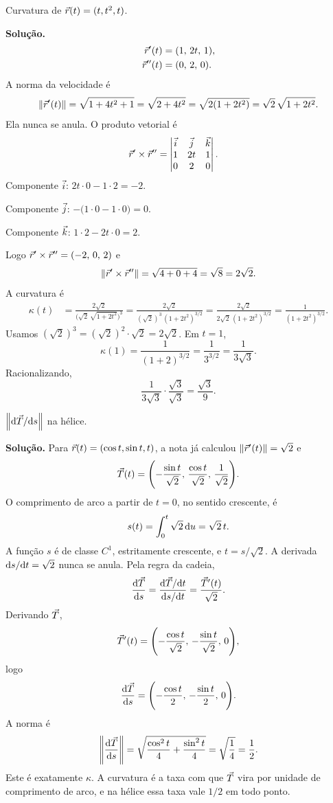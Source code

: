 \documentclass[11pt,a4paper]{article}
\begin{document}
\begin{exercicio}[Intermediário --- I2]
Curvatura de \(\vec{r}(t)=(t,t^{2},t)\).
\end{exercicio}

\noindent\textbf{Solução.}
\begin{align*}
\vec{r}'(t)&=(1,\,2t,\,1),\\
\vec{r}''(t)&=(0,\,2,\,0).
\end{align*}
A norma da velocidade é
\[
\left\lVert \vec{r}'(t) \right\rVert
=\sqrt{1+4t^{2}+1}
=\sqrt{2+4t^{2}}
=\sqrt{2(1+2t^{2})}
=\sqrt{2}\,\sqrt{1+2t^{2}}.
\]
Ela nunca se anula. O produto vetorial é
\begin{align*}
\vec{r}'\times\vec{r}''
&=
\begin{vmatrix}
\vec{i}&\vec{j}&\vec{k}\\
1&2t&1\\
0&2&0
\end{vmatrix}.
\end{align*}
Componente \(\vec{i}\): \(2t\cdot 0-1\cdot 2=-2\).

Componente \(\vec{j}\): \(-\bigl(1\cdot 0-1\cdot 0\bigr)=0\).

Componente \(\vec{k}\): \(1\cdot 2-2t\cdot 0=2\).

Logo \(\vec{r}'\times\vec{r}''=(-2,\,0,\,2)\) e
\[
\left\lVert \vec{r}'\times\vec{r}'' \right\rVert
=\sqrt{4+0+4}
=\sqrt{8}
=2\sqrt{2}.
\]
A curvatura é
\begin{align*}
\kappa(t)
&=\frac{2\sqrt{2}}{\bigl(\sqrt{2}\,\sqrt{1+2t^{2}}\bigr)^{3}}
=\frac{2\sqrt{2}}{(\sqrt{2})^{3}\,(1+2t^{2})^{3/2}}
=\frac{2\sqrt{2}}{2\sqrt{2}\,(1+2t^{2})^{3/2}}
=\frac{1}{(1+2t^{2})^{3/2}}.
\end{align*}
Usamos \((\sqrt{2})^{3}=(\sqrt{2})^{2}\cdot\sqrt{2}=2\sqrt{2}\). Em \(t=1\),
\[
\kappa(1)=\frac{1}{(1+2)^{3/2}}=\frac{1}{3^{3/2}}=\frac{1}{3\sqrt{3}}.
\]
Racionalizando,
\[
\frac{1}{3\sqrt{3}}\cdot\frac{\sqrt{3}}{\sqrt{3}}=\frac{\sqrt{3}}{9}.
\]

\begin{exercicio}[Intermediário --- I3]
\(\left\lVert \mathrm{d}\vec{T}/\mathrm{d} s \right\rVert\) na hélice.
\end{exercicio}

\noindent\textbf{Solução.}
Para \(\vec{r}(t)=(\cos t,\sin t,t)\), a nota já calculou \(\left\lVert \vec{r}'(t) \right\rVert=\sqrt{2}\) e
\[
\vec{T}(t)
=\Biggl(-\frac{\sin t}{\sqrt{2}},\,\frac{\cos t}{\sqrt{2}},\,\frac{1}{\sqrt{2}}\Biggr).
\]
O comprimento de arco a partir de \(t=0\), no sentido crescente, é
\[
s(t)=\int_{0}^{t}\sqrt{2}\,\mathrm{d} u=\sqrt{2}\,t.
\]
A função \(s\) é de classe \(C^1\), estritamente crescente, e \(t=s/\sqrt{2}\). A derivada \(\mathrm{d} s/\mathrm{d} t=\sqrt{2}\) nunca se anula. Pela regra da cadeia,
\[
\frac{\mathrm{d}\vec{T}}{\mathrm{d} s}
=\frac{\mathrm{d}\vec{T}/\mathrm{d} t}{\mathrm{d} s/\mathrm{d} t}
=\frac{\vec{T}'(t)}{\sqrt{2}}.
\]
Derivando \(\vec{T}\),
\[
\vec{T}'(t)
=\Biggl(-\frac{\cos t}{\sqrt{2}},\,-\frac{\sin t}{\sqrt{2}},\,0\Biggr),
\]
logo
\[
\frac{\mathrm{d}\vec{T}}{\mathrm{d} s}
=\Biggl(-\frac{\cos t}{2},\,-\frac{\sin t}{2},\,0\Biggr).
\]
A norma é
\[
\left\lVert \frac{\mathrm{d}\vec{T}}{\mathrm{d} s} \right\rVert
=\sqrt{\frac{\cos^{2}t}{4}+\frac{\sin^{2}t}{4}}
=\sqrt{\frac14}
=\frac12.
\]
Este é exatamente \(\kappa\). A curvatura é a taxa com que \(\vec{T}\) vira por unidade de comprimento de arco, e na hélice essa taxa vale \(1/2\) em todo ponto.
\end{document}
